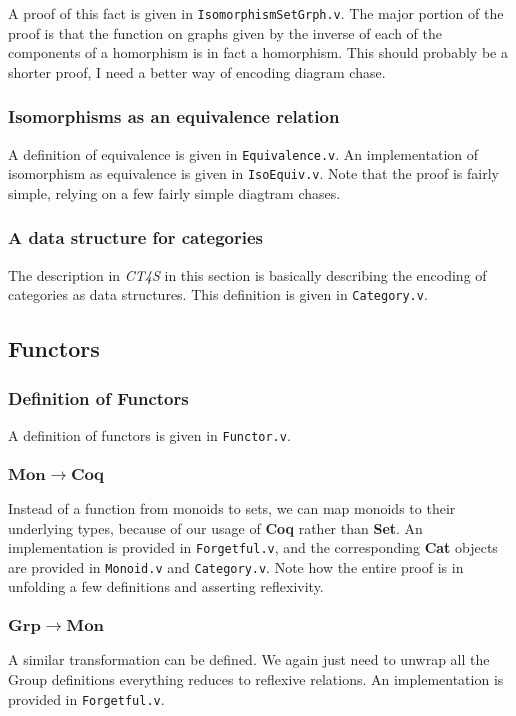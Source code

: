 \documentclass[12pt,twocolumn,oneside]{book}
\begin{document}
A proof of this fact is given in \texttt{IsomorphismSetGrph.v}. The major portion of the
proof is that the function on graphs given by the inverse of each of the components
of a homorphism is in fact a homorphism. This should probably be a shorter proof,
I need a better way of encoding diagram chase.

\subsubsection{Isomorphisms as an equivalence relation}

A definition of equivalence is given in \texttt{Equivalence.v}. An implementation
of isomorphism as equivalence is given in \texttt{IsoEquiv.v}. Note that the proof
is fairly simple, relying on a few fairly simple diagtram chases.

\subsubsection{A data structure for categories}

The description in \emph{CT4S} in this section is basically describing the encoding
of categories as data structures. This definition is given in \texttt{Category.v}.

\subsection{Functors}

\subsubsection{Definition of Functors}

A definition of functors is given in \texttt{Functor.v}.

\subsubsection{$\mathbf{Mon} \to \mathbf{Coq}$}

Instead of a function from monoids to sets, we can map monoids to their underlying types, because
of our usage of \textbf{Coq} rather than \textbf{Set}. An implementation is provided
in \texttt{Forgetful.v}, and the corresponding \textbf{Cat} objects are provided in \texttt{Monoid.v}
and \texttt{Category.v}. Note how the entire proof is in unfolding a few definitions and
asserting reflexivity.

\subsubsection{$\mathbf{Grp} \to \mathbf{Mon}$}

A similar transformation can be defined. We again just need to unwrap all the Group
definitions everything reduces to reflexive relations. An implementation is provided
in \texttt{Forgetful.v}.
\end{document}
